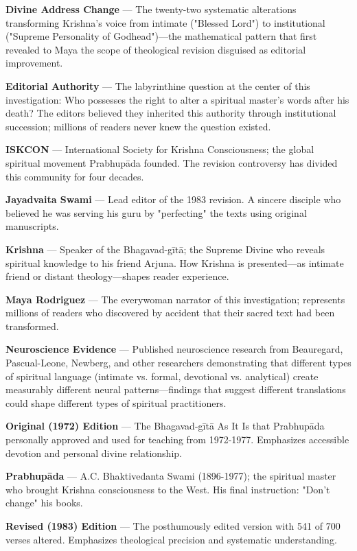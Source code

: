 \documentclass[12pt,twoside]{book}
\begin{document}
\textbf{Divine Address Change} — The twenty-two systematic alterations transforming Krishna's voice from intimate ("Blessed Lord") to institutional ("Supreme Personality of Godhead")—the mathematical pattern that first revealed to Maya the scope of theological revision disguised as editorial improvement.

\textbf{Editorial Authority} — The labyrinthine question at the center of this investigation: Who possesses the right to alter a spiritual master's words after his death? The editors believed they inherited this authority through institutional succession; millions of readers never knew the question existed.

\textbf{ISKCON} — International Society for Krishna Consciousness; the global spiritual movement Prabhupāda founded. The revision controversy has divided this community for four decades.

\textbf{Jayadvaita Swami} — Lead editor of the 1983 revision. A sincere disciple who believed he was serving his guru by "perfecting" the texts using original manuscripts.

\textbf{Krishna} — Speaker of the Bhagavad-gītā; the Supreme Divine who reveals spiritual knowledge to his friend Arjuna. How Krishna is presented—as intimate friend or distant theology—shapes reader experience.

\textbf{Maya Rodriguez} — The everywoman narrator of this investigation; represents millions of readers who discovered by accident that their sacred text had been transformed.

\textbf{Neuroscience Evidence} — Published neuroscience research from Beauregard, Pascual-Leone, Newberg, and other researchers demonstrating that different types of spiritual language (intimate vs. formal, devotional vs. analytical) create measurably different neural patterns—findings that suggest different translations could shape different types of spiritual practitioners.

\textbf{Original (1972) Edition} — The Bhagavad-gītā As It Is that Prabhupāda personally approved and used for teaching from 1972-1977. Emphasizes accessible devotion and personal divine relationship.

\textbf{Prabhupāda} — A.C. Bhaktivedanta Swami (1896-1977); the spiritual master who brought Krishna consciousness to the West. His final instruction: "Don't change" his books.

\textbf{Revised (1983) Edition} — The posthumously edited version with 541 of 700 verses altered. Emphasizes theological precision and systematic understanding.
\end{document}
